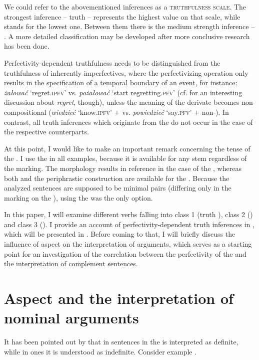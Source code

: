 \documentclass[output=paper,  modfonts,  newtxmath,  hidelinks		  ]{langscibook}
\begin{document}
We could refer to the abovementioned inferences as a \textsc{truthfulness scale}. The strongest inference -- truth  -- represents the highest value on that scale, while  stands for the lowest one. Between them there is the medium strength inference -- . A more detailed classification may be developed after more conclusive research has been done.

Perfectivity-dependent truthfulness needs to be distinguished from the truthfulness of inherently  imperfectives, where the perfectivizing operation only results in the specification of a temporal boundary of an event, for instance: \textit{żałować} `regret.\textsc{ipfv}’ vs. \textit{pożałować} `start regretting.\textsc{pfv}’ (cf. \citealt{Egré2008} for an interesting discussion about \textit{regret}, though), unless the meaning of the derivate becomes non-compositional (\textit{wiedzieć}
`know.\textsc{ipfv}’ +  vs. \textit{powiedzieć} `say.\textsc{pfv}’ + non-). In contrast, all truth inferences which originate from the  do not occur in the case of the respective  counterparts.\par At this point, I would like to make an important remark concerning the tense of the . I use the  in all examples, because it is available for any  stem regardless of the  marking. The  morphology results in  reference in the case of the , whereas both  and the periphrastic  construction are available for the . Because the analyzed sentences are supposed to be minimal pairs (differing only in the  marking on the ), using the  was the only option.\par In this paper, I will examine different verbs falling into class 1 (truth ), class 2 () and class 3 (). I provide an account of perfectivity-dependent truth inferences in , which will be presented in . Before coming to that, I will briefly discuss the influence of aspect on the interpretation of  arguments, which serves as a starting point for an investigation of the correlation between the perfectivity of the  and the interpretation of complement sentences.

\section{Aspect and the interpretation of nominal arguments}
It has been pointed out by \cite{Wierzbicka1967} that in  sentences in  the  is interpreted as definite, while in  ones it is understood as indefinite. Consider example .
\end{document}
